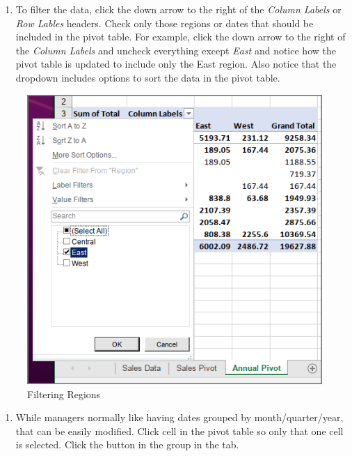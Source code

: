 	\begin{enumerate}[resume]
	\item To filter the data, click the down arrow to the right of the \textit{Column Labels} or \textit{Row Lables} headers. Check only those regions or dates that should be included in the pivot table. For example, click the down arrow to the right of the \textit{Column Labels} and uncheck everything except \textit{East} and notice how the pivot table is updated to include only the East region. Also notice that the dropdown includes options to sort the data in the pivot table.
\end{enumerate}

\begin{figure}[H]
	\centering
	\includegraphics[width=\maxwidth{.95\linewidth}]{gfx/ch07_fig22}
	\caption{Filtering Regions}
	\label{07:fig22}
\end{figure}

\begin{enumerate}[resume]
	\item While managers normally like having dates grouped by month/quarter/year, that can be easily modified. Click cell  in the pivot table so only that one cell is selected. Click the  button in the  group in the  tab.
\end{enumerate}

